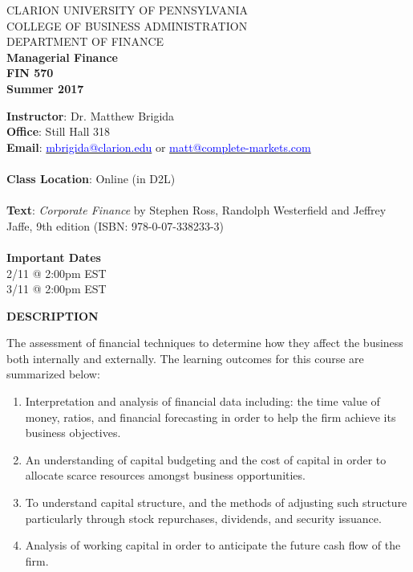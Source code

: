 \documentclass{article}
\begin{document}
\begin{center}
CLARION UNIVERSITY OF PENNSYLVANIA\\
COLLEGE OF BUSINESS ADMINISTRATION\\
DEPARTMENT OF FINANCE
\\
{\bf Managerial Finance}\\
{\bf FIN 570}\\
{\bf Summer 2017}\\
\end{center}
{\bf Instructor}: Dr. Matthew Brigida\\
{\bf Office}: Still Hall 318\\
{\bf Email}:  \href{mailto:mbrigida@clarion.edu}{\textcolor{blue}{mbrigida@clarion.edu}} or \href{mailto:matt@complete-markets.com}{\textcolor{blue}{matt@complete-markets.com}} \\
\\
{\bf Class Location}:  Online (in D2L)\\
\\
{\bf Text}: {\it Corporate Finance}\/ by Stephen Ross, Randolph Westerfield and Jeffrey Jaffe, 9th edition (ISBN: 978-0-07-338233-3)\\
\\
{\bf Important Dates}
\\
\hspace*{0.3cm}{\bf Midterm Exam:}  2/11 @ 2:00pm EST \\
\hspace*{0.3cm}{\bf Final Exam:}  3/11 @ 2:00pm EST
\begin{center}
{\bf DESCRIPTION}
\end{center}  
The assessment of financial techniques to determine how they affect the business both internally and externally. The learning outcomes for this course are summarized below:
\begin{enumerate}
\item Interpretation and analysis of financial data including: the time value of money, ratios, and financial forecasting in order to help the firm achieve its business objectives.
\item An understanding of capital budgeting and the cost of capital in order to allocate scarce resources amongst business opportunities.
\item To understand capital structure, and the methods of adjusting such structure particularly through stock repurchases, dividends, and security issuance.
\item Analysis of working capital in order to anticipate the future cash flow of the firm.
\end{enumerate}
\end{document}
